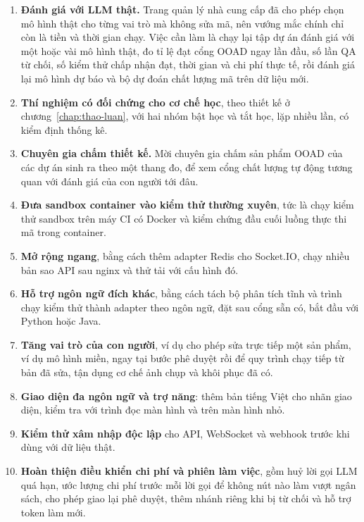 \begin{enumerate}
\item \textbf{Đánh giá với LLM thật.} Trang quản lý nhà cung cấp đã cho phép chọn mô hình thật cho từng vai trò mà không sửa mã, nên vướng mắc chính chỉ còn là tiền và thời gian chạy. Việc cần làm là chạy lại tập dự án đánh giá với một hoặc vài mô hình thật, đo tỉ lệ đạt cổng OOAD ngay lần đầu, số lần QA từ chối, số kiểm thử chấp nhận đạt, thời gian và chi phí thực tế, rồi đánh giá lại mô hình dự báo và bộ dự đoán chất lượng mã trên dữ liệu mới.
\item \textbf{Thí nghiệm có đối chứng cho cơ chế học}, theo thiết kế ở chương~\ref{chap:thao-luan}, với hai nhóm bật học và tắt học, lặp nhiều lần, có kiểm định thống kê.
\item \textbf{Chuyên gia chấm thiết kế.} Mời chuyên gia chấm sản phẩm OOAD của các dự án sinh ra theo một thang đo, để xem cổng chất lượng tự động tương quan với đánh giá của con người tới đâu.
\item \textbf{Đưa sandbox container vào kiểm thử thường xuyên}, tức là chạy kiểm thử sandbox trên máy CI có Docker và kiểm chứng đầu cuối luồng thực thi mã trong container.
\item \textbf{Mở rộng ngang}, bằng cách thêm adapter Redis cho Socket.IO, chạy nhiều bản sao API sau nginx và thử tải với cấu hình đó.
\item \textbf{Hỗ trợ ngôn ngữ đích khác}, bằng cách tách bộ phân tích tĩnh và trình chạy kiểm thử thành adapter theo ngôn ngữ, đặt sau cổng  sẵn có, bắt đầu với Python hoặc Java.
\item \textbf{Tăng vai trò của con người}, ví dụ cho phép sửa trực tiếp một sản phẩm, ví dụ mô hình miền, ngay tại bước phê duyệt rồi để quy trình chạy tiếp từ bản đã sửa, tận dụng cơ chế ảnh chụp và khôi phục đã có.
\item \textbf{Giao diện đa ngôn ngữ và trợ năng}: thêm bản tiếng Việt cho nhãn giao diện, kiểm tra với trình đọc màn hình và trên màn hình nhỏ.
\item \textbf{Kiểm thử xâm nhập độc lập} cho API, WebSocket và webhook trước khi dùng với dữ liệu thật.
\item \textbf{Hoàn thiện điều khiển chi phí và phiên làm việc}, gồm huỷ lời gọi LLM quá hạn, ước lượng chi phí trước mỗi lời gọi để không nút nào làm vượt ngân sách, cho phép giao lại phê duyệt, thêm nhánh riêng khi bị từ chối và hỗ trợ token làm mới.
\end{enumerate}
